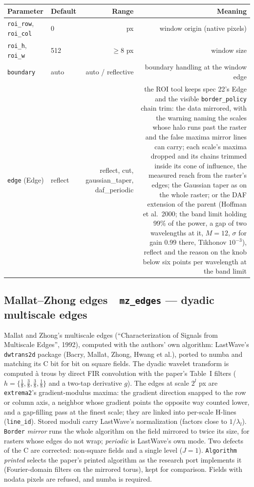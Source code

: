 \documentclass[10pt]{article}
\newcommand{\dev}[1]{\texttt{#1}}
\newcommand{\tool}[2]{#1~\textperiodcentered~\dev{#2}}
\begin{document}
\begin{longtable}{P l R N}
\toprule Parameter & Default & Range & Meaning \\ \midrule
\texttt{roi\_row}, \texttt{roi\_col} & 0 & px & window origin (native pixels) \\
\texttt{roi\_h}, \texttt{roi\_w} & 512 & $\ge 8$ px & window size \\
\texttt{boundary} & auto & auto / reflective & boundary handling at the window edge \\
\texttt{edge} (Edge) & reflect & reflect, cut, gaussian\_taper, daf\_periodic & the ROI tool keeps spec 22's Edge and the visible \texttt{border\_policy} chain trim: the data mirrored, with the warning naming the scales whose halo runs past the raster and the false maxima mirror lines can carry; each scale's maxima dropped and its chains trimmed inside its cone of influence, the measured reach from the raster's edges; the Gaussian taper as on the whole raster; or the DAF extension of the parent (Hoffman et al.\ 2000; the band limit holding 99\% of the power, a gap of two wavelengths at it, $M=12$, $\sigma$ for gain 0.99 there, Tikhonov $10^{-3}$), reflect and the reason on the knob below six points per wavelength at the band limit \\
\bottomrule
\end{longtable}

\subsection{\tool{Mallat--Zhong edges}{mz\_edges} --- dyadic multiscale edges}
Mallat and Zhong's multiscale edges (``Characterization of Signals from Multiscale Edges'', 1992),
computed with the authors' own algorithm: LastWave's \texttt{dwtrans2d} package (Bacry, Mallat,
Zhong, Hwang et al.), ported to numba and matching its C bit for bit on square fields. The dyadic
wavelet transform is computed \`a trous by direct FIR convolution with the paper's Table~I filters
($h=\{\frac18,\frac38,\frac38,\frac18\}$ and a two-tap derivative $g$). The edges at scale $2^l$ px
are \texttt{extrema2}'s gradient-modulus maxima: the gradient direction snapped to the row or column
axis, a neighbor whose gradient points the opposite way counted lower, and a gap-filling pass at
the finest scale; they are linked into per-scale H-lines (\texttt{line\_id}). Stored moduli carry
LastWave's normalization (factors close to $1/\lambda_l$). \texttt{Border} \emph{mirror} runs the
whole algorithm on the field mirrored to twice its size, for rasters whose edges do not wrap;
\emph{periodic} is LastWave's own mode. Two defects of the C are corrected: non-square fields and a
single level ($J=1$). \texttt{Algorithm} \emph{printed} selects the paper's printed algorithm as the
research port implements it (Fourier-domain filters on the mirrored torus), kept for comparison.
Fields with nodata pixels are refused, and numba is required.
\end{document}
